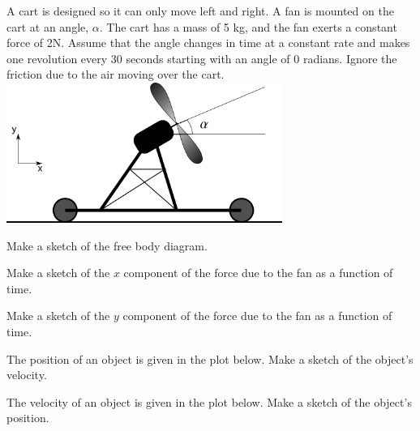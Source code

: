 \begin{problem}
\item A cart is designed so it can only move left and right. A fan is
  mounted on the cart at an angle, $\alpha$. The cart has a mass of 5
  kg, and the fan exerts a constant force of 2N. Assume that the angle
  changes in time at a constant rate and makes one revolution every 30
  seconds starting with an angle of 0 radians. Ignore the friction due
  to the air moving over the cart.  \\
  \includegraphics[width=9cm]{ink/week6/airCart}
  \begin{subproblem}
    \item Make a sketch of the free body diagram.
      \vspace{10em}
    \item Make a sketch of the $x$ component of the force due to the
      fan as a function of time.
      \vfill
    \item Make a sketch of the $y$ component of the force due to the
      fan as a function of time.
      \vfill
      \clearpage
    \item The position of an object is given in the plot below. Make
      a sketch of the object's velocity. \\
      \scalebox{0.65}{}

    \item The velocity of an object is given in the plot below. Make
      a sketch of the object's position. \\
      \scalebox{0.65}{}

  \end{subproblem}

  \clearpage


\end{problem}
